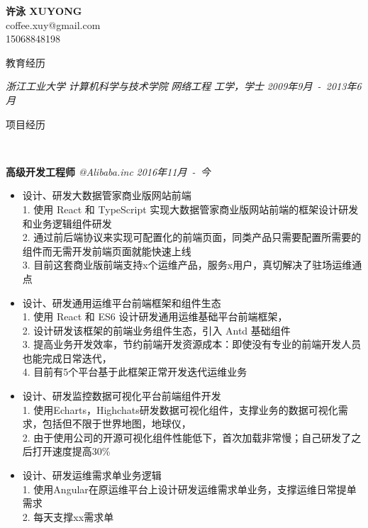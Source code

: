 ﻿\documentclass[9pt]{article}
\newenvironment{changemargin}[2]{%
  \begin{list}{}{%
    \setlength{\topsep}{0pt}%
    \setlength{\leftmargin}{#1}%
    \setlength{\rightmargin}{#2}%
    \setlength{\listparindent}{\parindent}%
    \setlength{\itemindent}{\parindent}%
    \setlength{\parsep}{\parskip}%
  }%
  \item[]}{\end{list}
}
\newcommand{\lineover}{
	\begin{changemargin}{-0.05in}{-0.05in}
		\vspace*{-8pt}
		\hrulefill \\
		\vspace*{-2pt}
	\end{changemargin}
}
\newcommand{\header}[1]{
	\begin{changemargin}{-0.5in}{-0.5in}
		\scshape{#1}\\
  	\lineover
	\end{changemargin}
}
\newcommand{\contact}[4]{
	\begin{changemargin}{-0.5in}{-0.5in}
		\begin{center}
			{\Large \scshape \textbf{#1}}\\ \smallskip
			{#2}\\ \smallskip
			{#3}\\ \smallskip
			{#4}\smallskip
		\end{center}
	\end{changemargin}
}
\newenvironment{body} {
	\vspace*{-16pt}
	\begin{changemargin}{-0.25in}{-0.5in}
  }	
	{\end{changemargin}
}
\begin{document}
\contact{许泳 XUYONG}{coffee.xuy@gmail.com}{15068848198}

\header{教育经历}
\begin{body}
	\vspace{14pt}
	\emph{浙江工业大学} \emph{计算机科学与技术学院} \emph{网络工程} \emph{工学，学士} \hfill \emph{2009年9月~-~2013年6月} \\
\end{body}

\smallskip

\header{项目经历}

\begin{body}
	\vspace{14pt}

    \textbf{高级开发工程师} \emph{@Alibaba.inc} \hfill \emph{2016年11月~-~今}\\
    \vspace*{-4pt}
    \begin{itemize} \itemsep -0pt  %
        \item 设计、研发大数据管家商业版网站前端\\
        1. 使用 React 和 TypeScript 实现大数据管家商业版网站前端的框架设计研发和业务逻辑组件研发\\
        2. 通过前后端协议来实现可配置化的前端页面，同类产品只需要配置所需要的组件而无需开发前端页面就能快速上线\\
        3. 目前这套商业版前端支持x个运维产品，服务x用户，真切解决了驻场运维通点\\
        \item 设计、研发通用运维平台前端框架和组件生态\\
        1. 使用 React 和 ES6 设计研发通用运维基础平台前端框架，\\
        2. 设计研发该框架的前端业务组件生态，引入 Antd 基础组件 \\
        3. 提高业务开发效率，节约前端开发资源成本：即使没有专业的前端开发人员也能完成日常迭代， \\
        4. 目前有5个平台基于此框架正常开发迭代运维业务\\
        \item 设计、研发监控数据可视化平台前端组件开发\\
        1. 使用Echarts，Highchats研发数据可视化组件，支撑业务的数据可视化需求，包括但不限于世界地图，地球仪，\\
        2. 由于使用公司的开源可视化组件性能低下，首次加载非常慢；自己研发了之后打开速度提高30\%\\
        \item 设计、研发运维需求单业务逻辑\\
        1. 使用Angular在原运维平台上设计研发运维需求单业务，支撑运维日常提单需求\\
        2. 每天支撑xx需求单\\
    \end{itemize}


\end{body}
\end{document}

